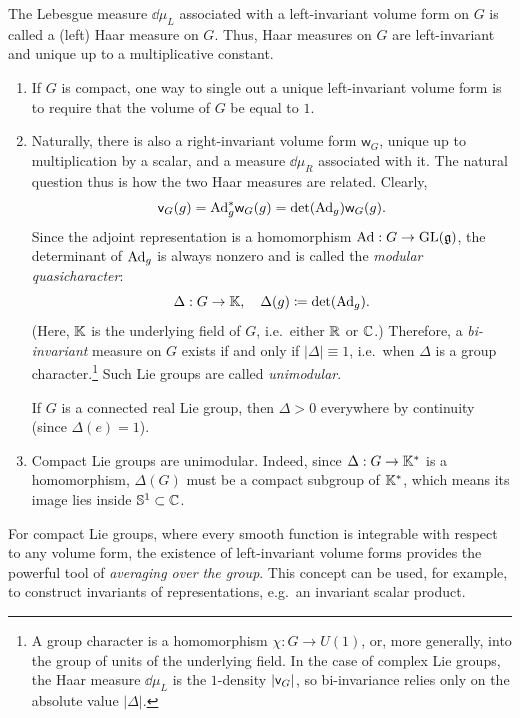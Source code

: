 \begin{defn}
    The Lebesgue measure $\dd\mu_L$ associated with a left-invariant volume form on $G$ is called a (left) Haar measure on $G$. Thus, Haar measures on $G$ are left-invariant and unique up to a multiplicative constant.
\end{defn}

\begin{rem}
    \begin{enumerate}
        \item If $G$ is compact, one way to single out a unique left-invariant volume form is to require that the volume of $G$ be equal to $1$.
        \item Naturally, there is also a right-invariant volume form $\mathsf{w}_G$, unique up to multiplication by a scalar, and a measure $\dd\mu_R$ associated with it. The natural question thus is how the two Haar measures are related. Clearly,
        \[\mathsf{v}_G(g)=\mathrm{Ad}_g^\ast \mathsf{w}_G(g)=\det(\mathrm{Ad}_g)\mathsf{w}_G(g).\]
        Since the adjoint representation is a homomorphism $\mathrm{Ad}:G\to\operatorname{GL}(\mathfrak{g})$, the determinant of $\mathrm{Ad}_g$ is always nonzero and is called the \emph{modular quasicharacter}:
        \[\Delta: G\to \mathbb{K},\quad \Delta(g)\coloneqq\det(\mathrm{Ad}_g).\]
        (Here, $\mathbb{K}$ is the underlying field of $G$, i.e.\ either $\mathbb{R}$ or $\mathbb{C}$.)
        Therefore, a \emph{bi-invariant} measure on $G$ exists if and only if $|\Delta|\equiv 1$, i.e.~when $\Delta$ is a group character.\footnote{A group character is a homomorphism $\chi:G\to U(1)$, or, more generally, into the group of units of the underlying field. In the case of complex Lie groups, the Haar measure $\dd \mu_L$ is the $1$-density $|\mathsf{v}_G|$, so bi-invariance relies only on the absolute value $|\Delta|$.} Such Lie groups are called \emph{unimodular}.
        
        If $G$ is a connected real Lie group, then $\Delta>0$ everywhere by continuity (since $\Delta(e)=1$). 
        \item Compact Lie groups are unimodular. Indeed, since $\Delta:G\to \mathbb{K}^\ast$ is a homomorphism, $\Delta(G)$ must be a compact subgroup of $\mathbb{K}^\ast$, which means its image lies inside $\mathbb{S}^1\subset\mathbb{C}$.
    \end{enumerate}
\end{rem}



For compact Lie groups, where every smooth function is integrable with respect to any volume form, the existence of left-invariant volume forms provides the powerful tool of \emph{averaging over the group}. This concept can be used, for example, to construct invariants of representations, e.g.~an invariant scalar product.

